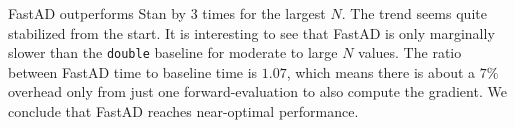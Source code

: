 FastAD outperforms Stan by 3 times for the largest $N$.
The trend seems quite stabilized from the start.
It is interesting to see that FastAD is only marginally slower than the \verb|double| baseline
for moderate to large $N$ values.
The ratio between FastAD time to baseline time is $ 1.07$, which means there is about a $7\%$ overhead only
from just one forward-evaluation to also compute the gradient.
We conclude that FastAD reaches near-optimal performance.
